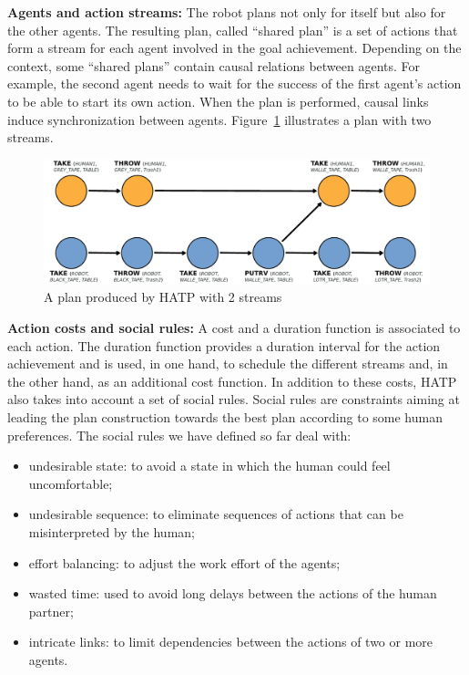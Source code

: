 \documentclass{svmult}
\begin{document}
\vspace{0.3cm}
\noindent
\textbf{Agents and action streams:}
The robot plans not only for itself but also for the other agents. The
resulting plan, called ``shared plan'' is a set of actions that form
a stream for each agent involved in the goal achievement. Depending on
the context, some ``shared plans'' contain causal relations between
agents. For example, the second agent needs to wait for the success of
the first agent's action to be able to start its own action. When the
plan is performed, causal links induce synchronization between
agents. Figure~\ref{plan_hatp1} illustrates a plan with two streams.

\begin{figure}[htbp]
  \centering
  \includegraphics[width=0.95\columnwidth]{./figs/plan1.pdf}
  \caption{A plan produced by HATP with 2 streams}
  \label{plan_hatp1}
\end{figure}

\vspace{0.3cm}
\noindent
\textbf{Action costs and social rules:}
A cost and a duration function is associated to each action.
The duration function provides a duration interval for the action
achievement and is used, in one hand, to schedule the different
streams and, in the other hand, as an additional cost function.
In addition to these costs, HATP also takes into account a set of social
rules.  Social rules are constraints aiming at leading the plan
construction towards the best plan according to some human
preferences. The social rules we have defined so far deal with:

\begin{itemize}
\item undesirable state: to avoid a state in which the human could
  feel uncomfortable;
\item undesirable sequence: to eliminate sequences of actions that can
  be misinterpreted by the human;
\item effort balancing: to adjust the work effort of the agents;
\item wasted time: used to avoid long delays between the actions of
  the human partner;
\item intricate links: to limit dependencies between the actions of
  two or more agents.
\end{itemize}
\end{document}
